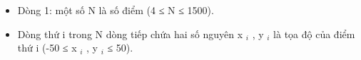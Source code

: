 \begin{itemize}
	\item     Dòng 1: một số N là số điểm (4 ≤ N ≤ 1500).   
	\item     Dòng thứ i trong N dòng tiếp chứa hai số nguyên   x    $_     i    $    , y    $_     i    $    là tọa độ của điểm thứ i (-50   ≤ x    $_     i    $    , y    $_     i    $    ≤ 50).   
\end{itemize}

\